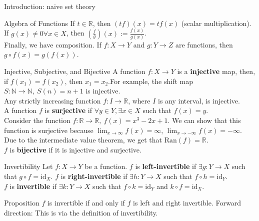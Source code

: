 \documentclass[10pt]{extarticle}
\begin{document}
{\begin{problem}{Introduction: naive set theory}
\begin{problem}{Algebra of Functions}
      If $t\in \mathbb{R}$, then $(tf)(x) = tf(x)$ (scalar multiplication). If $g(x)\neq 0\forall x\in X$, then $\left(\frac{f}{g}\right)(x) := \frac{f(x)}{g(x)}$.\\

      Finally, we have composition. If $f:X\rightarrow Y$ and $g:Y\rightarrow Z$ are functions, then $g\circ f(x) = g(f(x))$.
    \end{problem}
    \begin{problem}{Injective, Subjective, and Bijective}
      A function $f:X\rightarrow Y$ is a \textbf{injective} map, then, if $f(x_1) = f(x_2)$, then $x_1 = x_2$.For example, the shift map $S:\mathbb{N} \rightarrow \mathbb{N},~S(n) = n+1$ is injective.\\

      Any strictly increasing function $f:I\rightarrow \mathbb{R}$, where $I$ is any interval, is injective.\\

      A function $f$ is \textbf{surjective} if $\forall y\in Y, \exists x\in X$ such that $f(x) = y$.\\

      Consider the function $f:\mathbb{R} \rightarrow \mathbb{R},~f(x) = x^3-2x+1$. We can show that this function is surjective because $\lim_{x\rightarrow \infty}f(x) = \infty$, $\lim_{x\rightarrow -\infty} f(x) = -\infty$. Due to the intermediate value theorem, we get that $\textrm{Ran}(f) = \mathbb{R}$.\\

      $f$ is \textbf{bijective} if it is injective and surjective.
    \end{problem}
    \begin{problem}{Invertibility}
      Let $f:X\rightarrow Y$ be a function. $f$ is \textbf{left-invertible} if $\exists g:Y\rightarrow X$ such that $g\circ f = \textrm{id}_X$. $f$ is \textbf{right-invertible} if $\exists h:Y\rightarrow X$ such that $f\circ h = \textrm{id}_Y$.\\

      $f$ is \textbf{invertible} if $\exists k:Y\rightarrow X$ such that $f\circ k = \textrm{id}_Y$ and $k\circ f = \textrm{id}_X$.\\

      \begin{problem}{Proposition}
        $f$ is invertible if and only if $f$ is left and right invertible.
        \tcblower
          Forward direction: This is via the definition of invertibility.\\


\end{problem}
\end{problem}
\end{problem}}
\end{document}
